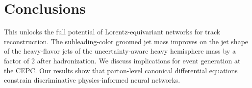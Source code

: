 \section{Conclusions}\label{sec:conclusions}

This unlocks the full potential of Lorentz-equivariant networks for
track reconstruction. The subleading-color groomed jet mass improves on
the jet shape of the heavy-flavor jets of the uncertainty-aware heavy
hemisphere mass by a factor of 2 after hadronization. We discuss
implications for event generation at the CEPC. Our results show that
parton-level canonical differential equations constrain discriminative
physics-informed neural networks.

